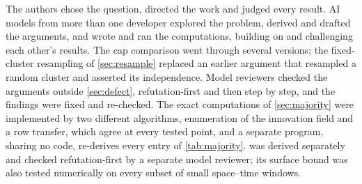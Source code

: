 \documentclass[11pt]{article}
\theoremstyle{plain}
\theoremstyle{definition}
\theoremstyle{remark}
\begin{document}
The authors chose the question, directed the work and judged every result. AI models from more than one developer explored the problem, derived and drafted the arguments, and wrote and ran the computations, building on and challenging each other's results. The cap comparison went through several versions; the fixed-cluster resampling of \cref{sec:resample} replaced an earlier argument that resampled a random cluster and asserted its independence. Model reviewers checked the arguments outside \cref{sec:defect}, refutation-first and then step by step, and the findings were fixed and re-checked. The exact computations of \cref{sec:majority} were implemented by two different algorithms, enumeration of the innovation field and a row transfer, which agree at every tested point, and a separate program, sharing no code, re-derives every entry of \cref{tab:majority}.  was derived separately and checked refutation-first by a separate model reviewer; its surface bound was also tested numerically on every subset of small space--time windows.
\end{document}
